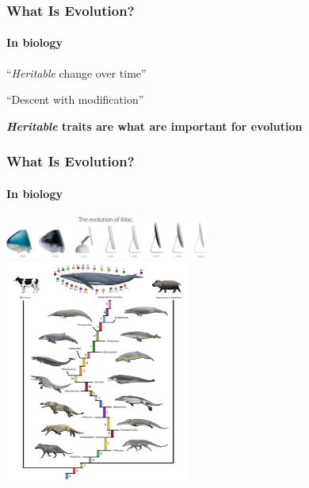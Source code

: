 \documentclass[10pt]{beamer}
\begin{document}
\begin{frame}[t]
\frametitle{What Is Evolution?}
\framesubtitle{In biology}
\vspace{0.5cm}

	``\textcolor{myblue}{\emph{Heritable} change over time}''

	\vspace{0.5cm}

	``Descent with modification''

	\vspace{0.5cm}
	
	\begin{center}
		\textbf{\emph{Heritable} traits are what are important for evolution}
	\end{center}
	
\end{frame}


\begin{frame}[t]
\frametitle{What Is Evolution?}
\framesubtitle{In biology}

	\begin{center}
		\includegraphics[width=0.5\textwidth]{figures/imac.jpg}\\
		\vspace{0.5cm}
		\includegraphics[width=0.45\textwidth]{figures/evolution.png}
	\end{center}
\end{frame}
\end{document}
